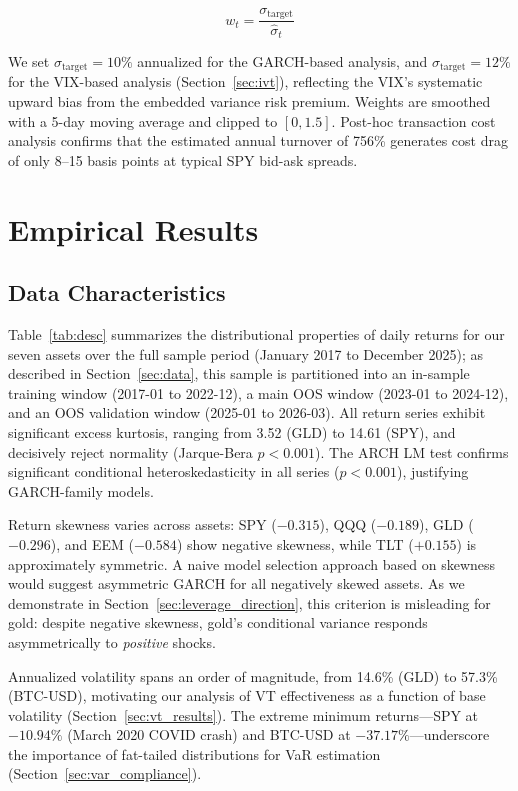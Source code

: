 \begin{equation}
w_t = \frac{\sigma_{\text{target}}}{\hat{\sigma}_t}
\end{equation}

We set $\sigma_{\text{target}} = 10\%$ annualized for the GARCH-based analysis, and $\sigma_{\text{target}} = 12\%$ for the VIX-based analysis (Section~\ref{sec:ivt}), reflecting the VIX's systematic upward bias from the embedded variance risk premium. Weights are smoothed with a 5-day moving average and clipped to $[0, 1.5]$. Post-hoc transaction cost analysis confirms that the estimated annual turnover of 756\% generates cost drag of only 8--15 basis points at typical SPY bid-ask spreads.



\section{Empirical Results}\label{sec:empirical_results}

\subsection{Data Characteristics}

Table~\ref{tab:desc} summarizes the distributional properties of daily returns for our seven assets over the full sample period (January 2017 to December 2025); as described in Section~\ref{sec:data}, this sample is partitioned into an in-sample training window (2017-01 to 2022-12), a main OOS window (2023-01 to 2024-12), and an OOS validation window (2025-01 to 2026-03). All return series exhibit significant excess kurtosis, ranging from 3.52 (GLD) to 14.61 (SPY), and decisively reject normality (Jarque-Bera $p < 0.001$). The ARCH LM test confirms significant conditional heteroskedasticity in all series ($p < 0.001$), justifying GARCH-family models.

Return skewness varies across assets: SPY ($-0.315$), QQQ ($-0.189$), GLD ($-0.296$), and EEM ($-0.584$) show negative skewness, while TLT ($+0.155$) is approximately symmetric. A naive model selection approach based on skewness would suggest asymmetric GARCH for all negatively skewed assets. As we demonstrate in Section~\ref{sec:leverage_direction}, this criterion is misleading for gold: despite negative skewness, gold's conditional variance responds asymmetrically to \textit{positive} shocks.

Annualized volatility spans an order of magnitude, from 14.6\% (GLD) to 57.3\% (BTC-USD), motivating our analysis of VT effectiveness as a function of base volatility (Section~\ref{sec:vt_results}). The extreme minimum returns---SPY at $-10.94\%$ (March 2020 COVID crash) and BTC-USD at $-37.17\%$---underscore the importance of fat-tailed distributions for VaR estimation (Section~\ref{sec:var_compliance}).


